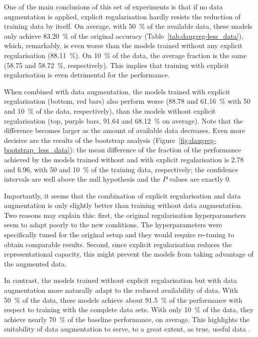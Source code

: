{One of the main conclusions of this set of experiments is that if no data augmentation is applied, explicit regularisation hardly resists the reduction of training data by itself. On average, with 50~\% of the available data, these models only achieve 83.20~\% of the original accuracy (Table~\ref{tab:daugreg-less_data}), which, remarkably, is even worse than the models trained without any explicit regularisation (88.11~\%). On 10~\% of the data, the average fraction is the same (58.75 and 58.72~\%, respectively). This implies that training with explicit regularisation is even detrimental for the performance.

When combined with data augmentation, the models trained with explicit regularisation (bottom, red bars) also perform worse (88.78 and 61.16~\% with 50 and 10~\% of the data, respectively), than the models without explicit regularisation (top, purple bars, 91.64 and 68.12~\% on average). Note that the difference becomes larger as the amount of available data decreases. Even more decisive are the results of the bootstrap analysis (Figure~\ref{fig:daugreg-bootstrap_less_data}): the mean difference of the fraction of the performance achieved by the models trained without and with explicit regularisation is 2.78 and 6.96, with 50 and 10~\% of the training data, respectively; the confidence intervals are well above the null hypothesis and the $P$ values are exactly 0.

Importantly, it seems that the combination of explicit regularisation and data augmentation is only slightly better than training without data augmentation. Two reasons may explain this: first, the original regularisation hyperparameters seem to adapt poorly to the new conditions. The hyperparameters were specifically tuned for the original setup and they would require re-tuning to obtain comparable results. Second, since explicit regularisation reduces the representational capacity, this might prevent the models from taking advantage of the augmented data.

In contrast, the models trained without explicit regularisation but with data augmentation more naturally adapt to the reduced availability of data. With 50~\% of the data, these models achieve about 91.5~\% of the performance with respect to training with the complete data sets. With only 10~\% of the data, they achieve nearly 70~\% of the baseline performance, on average. This highlights the suitability of data augmentation to serve, to a great extent, as true, useful data \citep{vinyals2016oneshot}.

}
